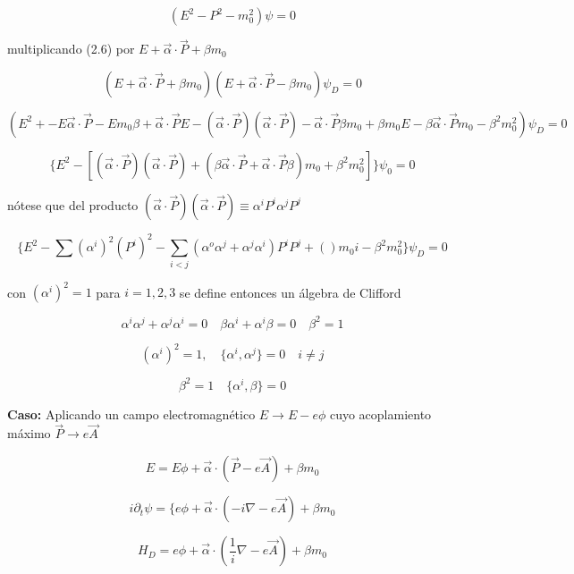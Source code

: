 \documentclass{report}
\begin{document}
\[(E^2 - P^2 -m_{0}^2)\psi = 0\]

multiplicando (2.6) por $E + \overrightarrow{\alpha} \cdot \overrightarrow{P} + \beta m_{0}$

\[(E + \overrightarrow{\alpha} \cdot \overrightarrow{P} + \beta m_{0})(E + \overrightarrow{\alpha} \cdot \overrightarrow{P} - \beta m_{0})\psi_{D} = 0\]

\[(E^2 + -E \overrightarrow{\alpha} \cdot \overrightarrow{P} -E m_{0} \beta + \overrightarrow{\alpha} \cdot \overrightarrow{P} E -(\overrightarrow{\alpha} \cdot \overrightarrow{P})(\overrightarrow{\alpha} \cdot \overrightarrow{P})- \overrightarrow{\alpha} \cdot \overrightarrow{P} \beta m_{0}+ \beta m_{0}E-\beta \overrightarrow{\alpha} \cdot \overrightarrow{P} m_{0} -\beta^2 m_{0}^2)\psi_{D} = 0\]

\[\lbrace E^2 -[(\overrightarrow{\alpha} \cdot \overrightarrow{P})(\overrightarrow{\alpha} \cdot \overrightarrow{P})+(\beta \overrightarrow{\alpha} \cdot \overrightarrow{P}+ \overrightarrow{\alpha} \cdot \overrightarrow{P} \beta) m_{0}+ \beta^{2} m_{0}^2]\rbrace \psi_{0}=0 \]

nótese que del producto $(\overrightarrow{\alpha} \cdot \overrightarrow{P})(\overrightarrow{\alpha} \cdot \overrightarrow{P}) \equiv \alpha^i P^i \alpha^j P^j$

\[\lbrace E^2 - \sum (\alpha^i)^2(P^i)^2 - \sum_{i <j} (\alpha^o \alpha^j + \alpha ^j \alpha^i) P^i P^j + ()m_{0} i - \beta ^2 m_{0}^2 \rbrace \psi_{D} = 0\]

con $(\alpha ^i)^2 = 1$ para $i = 1, 2, 3$ se define entonces un  álgebra de Clifford

\[\alpha^i \alpha ^j + \alpha ^j \alpha^i = 0 \quad \beta \alpha^i + \alpha ^i \beta =0 \quad \beta ^2 = 1\]

\[(\alpha ^i)^2 = 1 , \quad \lbrace \alpha^i, \alpha^j \rbrace = 0 \quad
i \neq j\]

\[\beta^2 = 1 \quad \lbrace \alpha^i, \beta \rbrace = 0\]

\textbf{Caso:}  Aplicando un campo electromagnético $ E \rightarrow E-e\phi$ cuyo acoplamiento máximo $\overrightarrow{P} \rightarrow e \overrightarrow{A}$

\[E = E\phi + \overrightarrow{\alpha} \cdot (\overrightarrow{P} - e \overrightarrow{A}) + \beta m_{0}\]

\[i \partial _{t} \psi = \lbrace e \phi + \overrightarrow{\alpha } \cdot (-i \nabla - e \overrightarrow{A}) + \beta m_{0}\]

\begin{equation}
H_{D} = e \phi + \overrightarrow{\alpha} \cdot (\frac{1}{i} \nabla - e \overrightarrow{A}) + \beta m_{0}
\end{equation}
\end{document}
